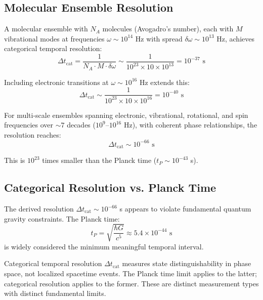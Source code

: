 \subsection{Molecular Ensemble Resolution}

\begin{corollary}
\label{cor:molecular_resolution}
A molecular ensemble with $N_A$ molecules (Avogadro's number), each with $M$ vibrational modes at frequencies $\omega \sim 10^{14}$ Hz with spread $\delta\omega \sim 10^{13}$ Hz, achieves categorical temporal resolution:
\begin{equation}
\Delta t_{\text{cat}} = \frac{1}{N_A \cdot M \cdot \delta\omega} \sim \frac{1}{10^{23} \times 10 \times 10^{13}} = 10^{-37} \text{ s}
\end{equation}
\end{corollary}

Including electronic transitions at $\omega \sim 10^{16}$ Hz extends this:
\begin{equation}
\Delta t_{\text{cat}} \sim \frac{1}{10^{23} \times 10 \times 10^{16}} = 10^{-40} \text{ s}
\end{equation}

For multi-scale ensembles spanning electronic, vibrational, rotational, and spin frequencies over $\sim 7$ decades ($10^{9}$--$10^{16}$ Hz), with coherent phase relationships, the resolution reaches:
\begin{equation}
\Delta t_{\text{cat}} \sim 10^{-66} \text{ s}
\end{equation}

This is $10^{23}$ times smaller than the Planck time ($t_P \sim 10^{-43}$ s).

\subsection{Categorical Resolution vs. Planck Time}

The derived resolution $\Delta t_{\text{cat}} \sim 10^{-66}$ s appears to violate fundamental quantum gravity constraints. The Planck time:
\begin{equation}
t_P = \sqrt{\frac{\hbar G}{c^5}} \approx 5.4 \times 10^{-44} \text{ s}
\end{equation}
is widely considered the minimum meaningful temporal interval.

\begin{proposition}
\label{prop:resolution_interpretation}
Categorical temporal resolution $\Delta t_{\text{cat}}$ measures state distinguishability in phase space, not localized spacetime events. The Planck time limit applies to the latter; categorical resolution applies to the former. These are distinct measurement types with distinct fundamental limits.
\end{proposition}

